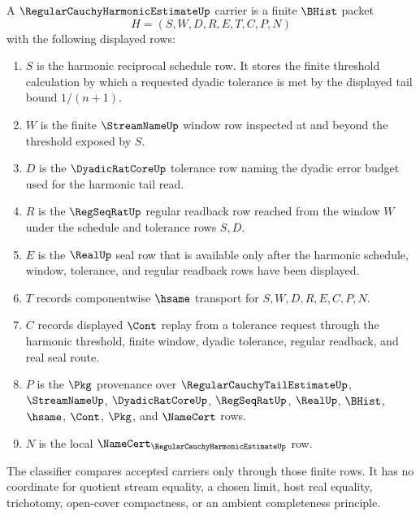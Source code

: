 \begin{definition}
\label{def:regular-cauchy-harmonic-estimate-carrier}
A $\RegularCauchyHarmonicEstimateUp$ carrier is a finite $\BHist$ packet
$$
H=(S,W,D,R,E,T,C,P,N)
$$
with the following displayed rows:
\begin{enumerate}
  \item $S$ is the harmonic reciprocal schedule row. It stores the finite threshold calculation by which a requested dyadic tolerance is met by the displayed tail bound $1/(n+1)$.
  \item $W$ is the finite $\StreamNameUp$ window row inspected at and beyond the threshold exposed by $S$.
  \item $D$ is the $\DyadicRatCoreUp$ tolerance row naming the dyadic error budget used for the harmonic tail read.
  \item $R$ is the $\RegSeqRatUp$ regular readback row reached from the window $W$ under the schedule and tolerance rows $S,D$.
  \item $E$ is the $\RealUp$ seal row that is available only after the harmonic schedule, window, tolerance, and regular readback rows have been displayed.
  \item $T$ records componentwise $\hsame$ transport for $S,W,D,R,E,C,P,N$.
  \item $C$ records displayed $\Cont$ replay from a tolerance request through the harmonic threshold, finite window, dyadic tolerance, regular readback, and real seal route.
  \item $P$ is the $\Pkg$ provenance over $\RegularCauchyTailEstimateUp$, $\StreamNameUp$, $\DyadicRatCoreUp$, $\RegSeqRatUp$, $\RealUp$, $\BHist$, $\hsame$, $\Cont$, $\Pkg$, and $\NameCert$ rows.
  \item $N$ is the local $\NameCert_{\RegularCauchyHarmonicEstimateUp}$ row.
\end{enumerate}
The classifier compares accepted carriers only through those finite rows. It has no coordinate for quotient stream equality, a chosen limit, host real equality, trichotomy, open-cover compactness, or an ambient completeness principle.
\end{definition}

